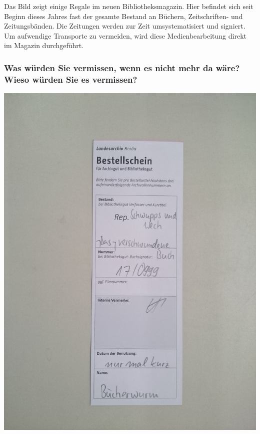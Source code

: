 Das Bild zeigt einige Regale im neuen Bibliotheksmagazin. Hier befindet
sich seit Beginn dieses Jahres fast der gesamte Bestand an Büchern,
Zeitschriften- und Zeitungsbänden. Die Zeitungen werden zur Zeit
umsystematisiert und signiert. Um aufwendige Transporte zu vermeiden,
wird diese Medienbearbeitung direkt im Magazin durchgeführt.

\hypertarget{was-wuxfcrden-sie-vermissen-wenn-es-nicht-mehr-da-wuxe4re-wieso-wuxfcrden-sie-es-vermissen}{%
\subsubsection*{Was würden Sie vermissen, wenn es nicht mehr da wäre? Wieso
würden Sie es
vermissen?}\label{was-wuxfcrden-sie-vermissen-wenn-es-nicht-mehr-da-wuxe4re-wieso-wuxfcrden-sie-es-vermissen}}

\begin{center}
\includegraphics{landesarchiv/img/Bestellschein.jpg}
\end{center}

